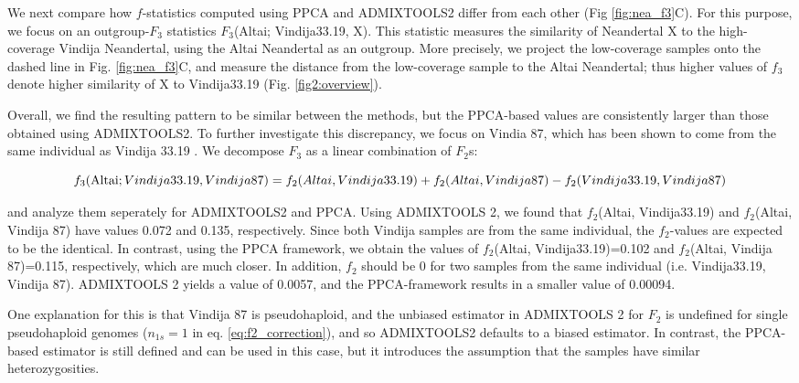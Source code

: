 \documentclass[12pt, letterpaper]{article}
\begin{document}
We next compare how $f$-statistics computed using PPCA and ADMIXTOOLS2 differ from each other (Fig \ref{fig:nea_f3}C). For this purpose, we focus on an outgroup-$F_3$ statistics $F_3$(Altai; Vindija33.19, X). This statistic measures the similarity of Neandertal X to the high-coverage Vindija Neandertal, using the Altai Neandertal as an outgroup. More precisely, we project the low-coverage samples onto the dashed line in Fig. \ref{fig:nea_f3}C, and measure the distance from the low-coverage sample to the Altai Neandertal; thus higher values of $f_3$ denote higher similarity of X to Vindija33.19 (Fig. \ref{fig2:overview}). 

Overall, we find the resulting pattern to be similar between the methods, but the PPCA-based values are consistently larger than those obtained using ADMIXTOOLS2. To further investigate this discrepancy, we focus on Vindia 87, which has been shown to come from the same individual as Vindija 33.19 \citep{hajdinjak_reconstructing_2018}. We decompose  $F_3$ as a linear combination of $F_2$s:

\begin{dmath}
    f_3(\text{Altai}; Vindija33.19, Vindija 87) = f_2(Altai, Vindija33.19) + f_2(Altai, Vindija 87) - f_2(Vindija33.19, Vindija 87)\\
\end{dmath}

and analyze them seperately for ADMIXTOOLS2 and PPCA.
Using ADMIXTOOLS 2, we found that $f_2$(Altai, Vindija33.19) and $f_2$(Altai, Vindija 87) have values 0.072 and 0.135,  respectively. Since both Vindija samples are from the same individual, the $f_2$-values are expected to be the identical. In contrast, using the PPCA framework, we obtain the values of $f_2$(Altai, Vindija33.19)=0.102 and $f_2$(Altai, Vindija 87)=0.115, respectively, which are much closer. In addition, $f_2$ should be 0 for two samples from the same individual (i.e. Vindija33.19, Vindija 87). ADMIXTOOLS 2 yields a value of 0.0057, and the PPCA-framework results in a smaller value of 0.00094. 

One explanation for this is that Vindija 87 is pseudohaploid, and the unbiased estimator in ADMIXTOOLS 2 for $F_2$ is undefined for single pseudohaploid genomes ($n_{1s}=1$ in eq. \ref{eq:f2_correction}), and so ADMIXTOOLS2 defaults to a biased estimator. In contrast, the PPCA-based estimator is still defined and can be used in this case, but it introduces the assumption that the samples have similar heterozygosities. 
\end{document}
